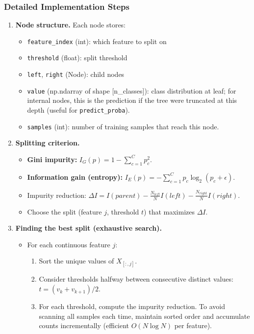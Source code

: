 \documentclass[11pt,a4paper]{article}
\begin{document}
\subsubsection{Detailed Implementation Steps}
\begin{enumerate}[leftmargin=2.2em,label=\textbf{DT.\arabic*}]
  \item \textbf{Node structure.} Each node stores:
    \begin{itemize}
      \item \texttt{feature\_index} (int): which feature to split on
      \item \texttt{threshold} (float): split threshold
      \item \texttt{left}, \texttt{right} (Node): child nodes
      \item \texttt{value} (np.ndarray of shape [n\_classes]): class distribution at leaf; for internal nodes, this is the prediction if the tree were truncated at this depth (useful for \texttt{predict\_proba}).
      \item \texttt{samples} (int): number of training samples that reach this node.
    \end{itemize}
  \item \textbf{Splitting criterion.}
    \begin{itemize}
      \item \textbf{Gini impurity:} $I_G(p) = 1 - \sum_{c=1}^C p_c^2$.
      \item \textbf{Information gain (entropy):} $I_E(p) = -\sum_{c=1}^C p_c \log_2(p_c + \epsilon)$.
      \item Impurity reduction: $\Delta I = I(parent) - \frac{N_{left}}{N} I(left) - \frac{N_{right}}{N} I(right)$.
      \item Choose the split (feature $j$, threshold $t$) that maximizes $\Delta I$.
    \end{itemize}
  \item \textbf{Finding the best split (exhaustive search).}
    \begin{itemize}
      \item For each continuous feature $j$:
        \begin{enumerate}
          \item Sort the unique values of $X_{[:,j]}$.
          \item Consider thresholds halfway between consecutive distinct values: $t = (v_k + v_{k+1})/2$.
          \item For each threshold, compute the impurity reduction. To avoid scanning all samples each time, maintain sorted order and accumulate counts incrementally (efficient $O(N \log N)$ per feature).

\end{enumerate}
\end{itemize}
\end{enumerate}
\end{document}

